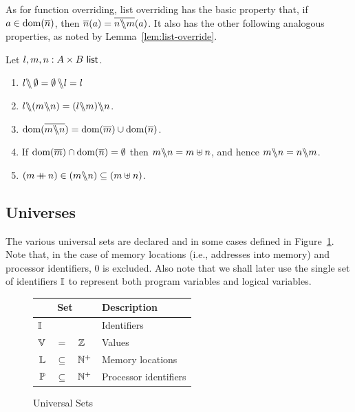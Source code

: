\documentclass[11pt]{report}
\begin{document}
As for function overriding, list overriding has the basic property that, if $a \in \operatorname{\mathrm{dom}}(\overline{n})$, then $\overline{n}(a) = \overline{n \backslash\!\!\backslash m}(a)$. It also has the other following analogous properties, as noted by Lemma~\ref{lem:list-override}. 
\begin{lemma}
    \label{lem:list-override}
    Let $l,m,n : A \times B~\mathsf{list}$. 
    \begin{enumerate}
        \item $l \backslash\!\!\backslash \operatorname{\emptyset} = \operatorname{\emptyset} \backslash\!\!\backslash l = l$
        \item $l \override (m \override n) = (l \override m) \override n$. 
        \item $\operatorname{\mathrm{dom}}(\overline{m \backslash\!\!\backslash n}) = \operatorname{\mathrm{dom}}(\overline{m}) \cup \operatorname{\mathrm{dom}}(\overline{n})$. 
        \item If $\operatorname{\mathrm{dom}}(\overline{m}) \cap \operatorname{\mathrm{dom}}(\overline{n}) = \operatorname{\emptyset}$ then $m \backslash\!\!\backslash n = m \uplus n$, and hence $m \backslash\!\!\backslash n = n \backslash\!\!\backslash m$. 
        \item $(m \operatorname{+\!\!\!+} n) \in (m \backslash\!\!\backslash n) \subseteq (m \uplus n)$.
    \end{enumerate}
\end{lemma}


\subsection{Universes}
\label{sec:universes} 

The various universal sets are declared and in some cases defined in Figure~\ref{fig:universes}. Note that, in the case of memory locations (i.e., addresses into memory) and processor identifiers, 0 is excluded. Also note that we shall later use the single set of identifiers $\mathbb{I}$ to represent both program variables and logical variables.

\begin{figure}[ht]
  \centering
  \begin{tabular}{rcl|l}
    \multicolumn{3}{c}{Set} & Description \\ \hline
    \multicolumn{3}{l|}{$\mathbb{I}$} & Identifiers \\
    $\mathbb{V}$ & $=$ &  $\mathbb{Z}$ & Values \\
    $\mathbb{L}$ & $\subseteq$  &  $\mathbb{N}^+$ & Memory locations \\
    $\mathbb{P}$ &$\subseteq$ &  $\mathbb{N}^+$ & Processor identifiers
  \end{tabular}
  \caption{\label{fig:universes}Universal Sets}
\end{figure}
\end{document}
